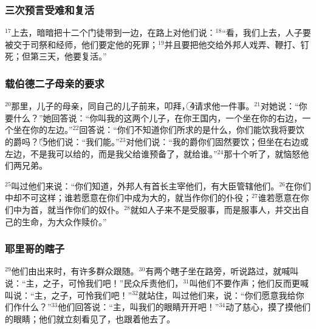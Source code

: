 \subsubsection{三次预言受难和复活}
$^{17}$\UL[耶稣]上\UL[耶路撒冷]去，暗暗把十二个门徒带到一边，在路上对他们说：$^{18}$“看，我们上\UL[耶路撒冷]去，人子要被交于司祭和经师，他们要定他的死罪；$^{19}$并且要把他交给外邦人戏弄、鞭打、钉死；但第三天，他要复活。”


\subsubsection{载伯德二子母亲的要求}
$^{20}$那里，\UL[载伯德]儿子的母亲，同自己的儿子前来，叩拜\UL[耶稣]，\textcircled{4}请求他一件事。$^{21}$\UL[耶稣]对她说：“你要什么？”她回答说：“你叫我的这两个儿子，在你王国内，一个坐在你的右边，一个坐在你的左边。”$^{22}$\UL[耶稣]回答说：“你们不知道你们所求的是什么，你们能饮我将要饮的爵吗？”\textcircled{5}他们说：“我们能。”$^{23}$\UL[耶稣]对他们说：“我的爵你们固然要饮；但坐在右边或左边，不是我可以给的，而是我父给谁预备了，就给谁。”$^{24}$那十个听了，就恼怒他们两兄弟。

$^{25}$\UL[耶稣]叫过他们来说：“你们知道，外邦人有首长主宰他们，有大臣管辖他们。$^{26}$在你们中却不可这样；谁若愿意在你们中成为大的，就当作你们的仆役；$^{27}$谁若愿意在你们中为首，就当作你们的奴仆。$^{28}$就如人子来不是受服事，而是服事人，并交出自己的生命，为大众作赎价。”


\subsubsection{耶里哥的瞎子}
$^{29}$他们由\UL[耶里哥]出来时，有许多群众跟随\UL[耶稣]。$^{30}$有两个瞎子坐在路旁，听说\UL[耶稣]路过，就喊叫说：“主，\UL[达味]之子，可怜我们吧！”民众斥责他们，$^{31}$叫他们不要作声；他们反而更喊叫说：“主，\UL[达味]之子，可怜我们吧！”$^{32}$\UL[耶稣]就站住，叫过他们来，说：“你们愿意我给你们作什么？”$^{33}$他们回答说：“主，叫我们的眼睛开开吧！”$^{34}$\UL[耶稣]动了慈心，摸了摸他们的眼睛；他们就立刻看见了，也跟着他去了。



